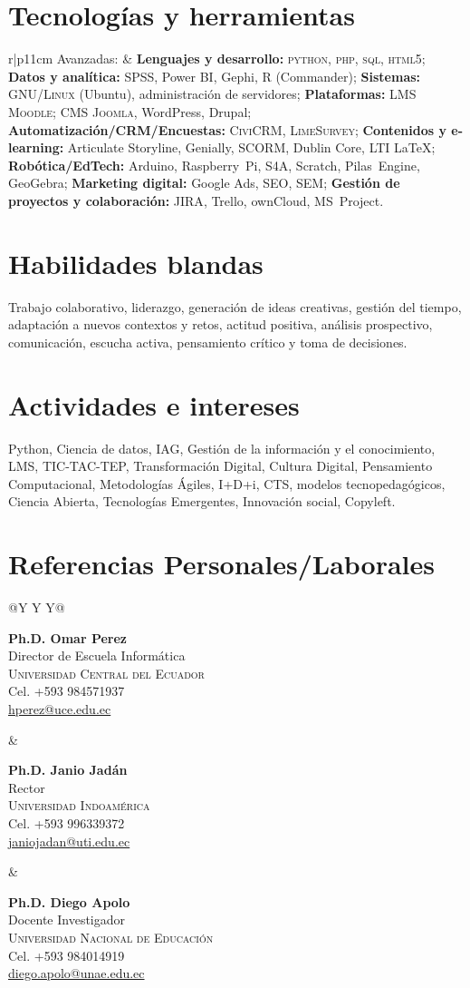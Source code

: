 \documentclass[a4paper]{article}
\newcommand{\refe}[5]{%
  \parbox[t]{\linewidth}{\small
    \textbf{#1}\\
    #2\\
    \textsc{#3}\\
    #4\\
    \href{mailto:#5}{#5}%
  }%
}
\begin{document}
\section{Tecnologías y herramientas}
\begin{longtable}{r|p{11cm}}
Avanzadas: &
\textbf{Lenguajes y desarrollo:} \textsc{python}, \textsc{php}, \textsc{sql}, \textsc{html5};\quad
\textbf{Datos y analítica:} SPSS, Power BI, Gephi, \textsc{R} (Commander);\quad 
\textbf{Sistemas:} \textsc{GNU/Linux} (Ubuntu), administración de servidores;\quad
\textbf{Plataformas:} LMS \textsc{Moodle}; CMS \textsc{Joomla}, WordPress, Drupal;\quad
\textbf{Automatización/CRM/Encuestas:} \textsc{CiviCRM}, \textsc{LimeSurvey};\quad
\textbf{Contenidos y e-learning:} Articulate Storyline, Genially, SCORM, Dublin Core, LTI {\fb\LaTeX};\quad
\textbf{Robótica/EdTech:} Arduino, Raspberry~Pi, S4A, Scratch, Pilas~Engine, GeoGebra;\quad
\textbf{Marketing digital:} Google Ads, \textsc{SEO}, \textsc{SEM};\quad
\textbf{Gestión de proyectos y colaboración:} \textsc{JIRA}, Trello, ownCloud, MS~Project.
\\
\end{longtable}





\section{Habilidades blandas}
Trabajo colaborativo, liderazgo, generación de ideas creativas, gestión del tiempo, adaptación a nuevos contextos y retos, actitud positiva, análisis  prospectivo, comunicación, escucha activa,  pensamiento crítico  y toma de decisiones. 
\section{Actividades e intereses}
Python, Ciencia de datos, IAG, Gestión de la información y el conocimiento, LMS, TIC-TAC-TEP, Transformación Digital, Cultura Digital, Pensamiento Computacional, Metodologías Ágiles,  I+D+i, CTS, modelos tecnopedagógicos, Ciencia Abierta, Tecnologías Emergentes, Innovación social, Copyleft.
\section{Referencias Personales/Laborales}

\begin{center}
\setlength{\tabcolsep}{10pt}
\renewcommand{\arraystretch}{1.1}
\begin{tabularx}{\textwidth}{@{}Y Y Y@{}}
\refe{Ph.D. Omar Perez}{Director de Escuela Informática}
     {Universidad Central del Ecuador}{Cel. +593 984571937}{hperez@uce.edu.ec}
&
\refe{Ph.D. Janio Jadán}{Rector}
     {Universidad Indoamérica}{Cel. +593 996339372}{janiojadan@uti.edu.ec}
&
\refe{Ph.D. Diego Apolo}{Docente Investigador}
     {Universidad Nacional de Educación}{Cel. +593 984014919}{diego.apolo@unae.edu.ec}
\end{tabularx}
\end{center}
\end{document}
